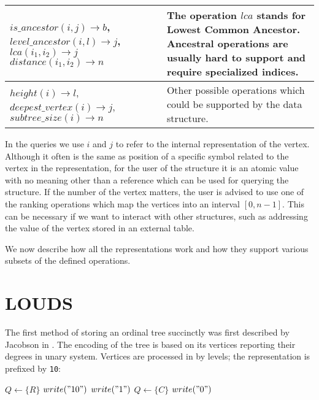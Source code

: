 \begin{tabularx}{\textwidth}{|L{0.7}|L{1.3}|}
	$is\_ancestor(i, j) \rightarrow b$, \newline
	$level\_ancestor(i, l) \rightarrow j$, \newline
	$lca(i_1, i_2) \rightarrow j$
	$distance(i_1, i_2) \rightarrow n$
	& The operation $lca$ stands for Lowest Common Ancestor.
	Ancestral operations are usually hard to support and require specialized indices. \\ \hline
	
	$height(i) \rightarrow l$, \newline
	$deepest\_vertex(i) \rightarrow j$, \newline
	$subtree\_size(i) \rightarrow n$
	& Other possible operations which could be supported by the data structure. \\ \hline
\end{tabularx}

In the queries we use $i$ and $j$ to refer to the internal representation of the vertex.
Although it often is the same as position of a specific symbol related to the vertex in the representation, for the user of the structure it is an atomic value with no meaning other than a reference which can be used for querying the structure.
If the number of the vertex matters, the user is advised to use one of the ranking operations which map the vertices into an interval $[0, n-1]$.
This can be necessary if we want to interact with other structures, such as addressing the value of the vertex stored in an external table.

\bigskip

We now describe how all the representations work and how they support various subsets of the defined operations.

\section{LOUDS}

The first method of storing an ordinal tree succinctly was first described by Jacobson in .
The encoding of the tree is based on its vertices reporting their degrees in unary system.
Vertices are processed in by levels; the representation is prefixed by \verb|10|:


\begin{algorithmic}
	\State $Q \gets \{R\}$ 
	\State $write("10")$
			\State $write("1")$
			\State $Q \gets \{C\}$
		\EndFor
		\State $write("0")$
	\EndWhile
\EndFunction
\end{algorithmic}

